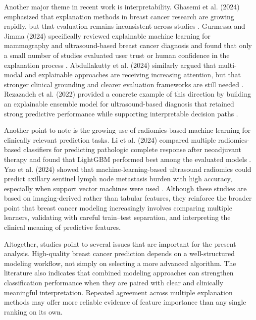 \documentclass[conference]{IEEEtran}
\begin{document}
Another major theme in recent work is interpretability. Ghasemi et al. (2024) emphasized that explanation methods in breast cancer research are growing rapidly, but that evaluation remains inconsistent across studies \cite{b7}. Gurmessa and Jimma (2024) specifically reviewed explainable machine learning for mammography and ultrasound-based breast cancer diagnosis and found that only a small number of studies evaluated user trust or human confidence in the explanation process \cite{b17}. Abdullakutty et al. (2024) similarly argued that multi-modal and explainable approaches are receiving increasing attention, but that stronger clinical grounding and clearer evaluation frameworks are still needed \cite{b18}. Rezazadeh et al. (2022) provided a concrete example of this direction by building an explainable ensemble model for ultrasound-based diagnosis that retained strong predictive performance while supporting interpretable decision paths \cite{b20}.

Another point to note is the growing use of radiomics-based machine learning for clinically relevant prediction tasks. Li et al. (2024) compared multiple radiomics-based classifiers for predicting pathologic complete response after neoadjuvant therapy and found that LightGBM performed best among the evaluated models \cite{b15}. Yao et al. (2024) showed that machine-learning-based ultrasound radiomics could predict axillary sentinel lymph node metastasis burden with high accuracy, especially when support vector machines were used \cite{b16}. Although these studies are based on imaging-derived rather than tabular features, they reinforce the broader point that breast cancer modeling increasingly involves comparing multiple learners, validating with careful train--test separation, and interpreting the clinical meaning of predictive features.

Altogether, studies point to several issues that are important for the present analysis. High-quality breast cancer prediction depends on a well-structured modeling workflow, not simply on selecting a more advanced algorithm. The literature also indicates that combined modeling approaches can strengthen classification performance when they are paired with clear and clinically meaningful interpretation. Repeated agreement across multiple explanation methods may offer more reliable evidence of feature importance than any single ranking on its own.
\end{document}

